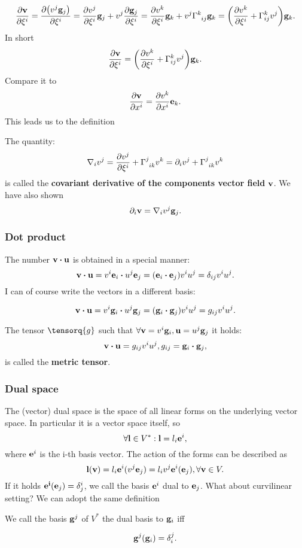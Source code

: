 \documentclass[../main.tex]{subfiles}
\begin{document}
\begin{equation}
	\pdv{\vb{v}}{\xi^i}=\pdv{\qty(v^j \vb{g}_j)}{\xi^i}= \pdv{v^j}{\xi^i}\vb{g}_j + v^j \pdv{\vb{g}_j}{\xi^i} = \pdv{v^k}{\xi^i}\vb{g}_k + v^j \Gamma \indices{^k_{ij}} \vb{g}_k = \qty(\pdv{v^k}{\xi^i}+\Gamma^k_{ij}v^j) \vb{g}_k.
\end{equation}
In short
\[
	\pdv{\vb{v}}{\xi^i} = \qty(\pdv{v^k}{\xi^i}+\Gamma^k_{ij}v^j) \vb{g}_k.
\]
Compare it to
\[
	\pdv{\vb{v}}{x^i}=\pdv{v^k}{x^i}\vb{e}_k.
\]
This leads us to the definition

\begin{definition}
    The quantity:
\begin{equation}
	\nabla_i v^j = \pdv{v^j}{\xi^i} + \Gamma \indices{^j_{ik}}v^k = \partial_{i}v^j + \Gamma \indices{^j_{ik}}v^k
\end{equation}
is called the \textbf{covariant derivative of the components vector field }$\vb{v}$. We have also shown
\[
	\partial_{i} \vb{v} = \nabla_i v^j \vb{g}_j.
\]
\end{definition}

\subsubsection{Dot product}
\label{sec:dot_product}

The number $\vb{v}\vdot \vb{u}$ is obtained in a special manner:
\[
	\vb{v} \vdot \vb{u}= v^i \vb{e}_i \vdot u^j \vb{e}_j = (\vb{e}_i \vdot \vb{e}_j) v^i u^j = \delta_{ij}v^i u^j.
\]
I can of course write the vectors in a different basis:

\[
	\vb{v}\vdot \vb{u} = v^i \vb{g}_i \vdot u^j \vb{g}_j = (\vb{g}_i \vdot \vb{g}_j) v^i u^j = g_{ij}v^i u^j.
\]

\begin{definition}
    The tensor $\tensorq{g}$ such that $\forall \vb{v} = v^i \vb{g}_i, \vb{u}= u^j \vb{g}_j$ it holds:
    \[
	    \vb{v} \vdot \vb{u}=g_{ij} v^i u^j, g_{ij}= \vb{g}_i \vdot \vb{g}_j,
    \]
    is called the \textbf{metric tensor}.
\end{definition}


\subsubsection{Dual space}
\label{sec:dual_space}

The (vector) dual space is the space of all linear forms on the underlying vector space. In particular it is a vector space itself, so
\[
	\forall \vb{l} \in V^{*}: \vb{l} = l_i \vb{e}^i,
\]
where $\vb{e}^i$ is the i-th basis vector. The action of the forms can be described as
\[
	\vb{l}(\vb{v}) = l_i \vb{e}^i(v^j \vb{e}_j) = l_i v^j \vb{e}^i(\vb{e}_j), \forall \vb{v} \in V.
\]
If it holds $\vb{e^i}(\vb{e}_j) = \delta^i_j$, we call the basis $\vb{e}^i$ dual to $\vb{e}_j$. What about curvilinear setting? We can adopt the same definition
\begin{definition}
    We call the basis $\vb{g}^j$ of $V^{*}$ the dual basis to $\vb{g}_i$ iff

\[
	\vb{g}^j(\vb{g}_i) = \delta^j_i.
\]
\end{definition}
\end{document}
